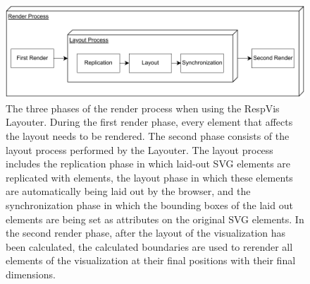 \begin{figure}[tp]
\centering
\includegraphics[keepaspectratio,width=\linewidth,height=\fullh]
{diagrams/respvis-render-process.pdf}
\caption[Render Process When Using the Layouter]{%
The three phases of the render process when using the RespVis
Layouter. During the first render phase, every element that affects
the layout needs to be rendered. The second phase consists of the
layout process performed by the Layouter. The layout process includes
the replication phase in which laid-out SVG elements are replicated
with  elements, the layout phase in which these
 elements are automatically being laid out by the
browser, and the synchronization phase in which the bounding boxes of
the laid out  elements are being set as
 attributes on the original SVG elements. In the
second render phase, after the layout of the visualization has been
calculated, the calculated boundaries are used to rerender all
elements of the visualization at their final positions with their
final dimensions.  }
\label{fig:RenderProcess}
\end{figure}

